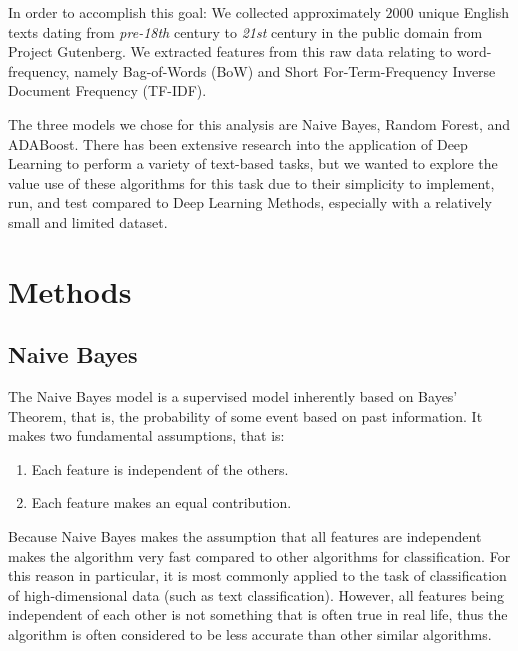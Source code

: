 \documentclass{article}
\begin{document}
In order to accomplish this goal: We collected approximately $2000$ unique 
  English texts dating from \emph{pre-18th} century to \emph{21st} century in the 
  public domain from Project Gutenberg. We extracted features from this raw data
  relating to word-frequency, namely Bag-of-Words (BoW) and Short For-Term-Frequency 
  Inverse Document Frequency (TF-IDF).

The three models we chose for this analysis are
  Naive Bayes, Random Forest, and ADABoost. There has been extensive research 
  into the application of Deep Learning to perform a variety of text-based 
  tasks, but we wanted to explore the value use of these algorithms for this task
  due to their simplicity to implement, run, and test compared to Deep
  Learning Methods, especially with a relatively small and limited dataset. 




\section{Methods}
\label{methods}

\subsection{Naive Bayes}

The Naive Bayes model is a supervised model inherently based on Bayes' Theorem, that is, the 
probability of some event based on past information. It makes two fundamental 
assumptions, that is: 
\begin{enumerate}
  \item Each feature is independent of the others.
  \item Each feature makes an equal contribution. 
\end{enumerate}

Because Naive Bayes makes the assumption that all features are independent makes the algorithm
  very fast compared to other algorithms for classification. For this reason in particular, it 
  is most commonly applied to the task of classification of high-dimensional data (such as text 
  classification). However, all features being independent of each other is not something that
  is often true in real life, thus the algorithm is often considered to be less accurate than
  other similar algorithms.
\end{document}
